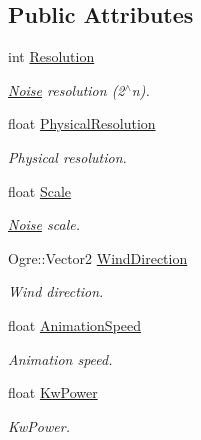 \subsection*{Public Attributes}
\begin{CompactItemize}
\item 
int \hyperlink{struct_hydrax_1_1_noise_1_1_f_f_t_1_1_options_5e7cb0d860838ae205212b13aad05a4b}{Resolution}
\begin{CompactList}\small\item\em \hyperlink{class_hydrax_1_1_noise_1_1_noise}{Noise} resolution (2$^\wedge$n). \item\end{CompactList}\item 
float \hyperlink{struct_hydrax_1_1_noise_1_1_f_f_t_1_1_options_f1273c65d2872198ae6b3c1dfb150ff4}{PhysicalResolution}
\begin{CompactList}\small\item\em Physical resolution. \item\end{CompactList}\item 
float \hyperlink{struct_hydrax_1_1_noise_1_1_f_f_t_1_1_options_98e3899bdfe6bf54910192543fbc374c}{Scale}
\begin{CompactList}\small\item\em \hyperlink{class_hydrax_1_1_noise_1_1_noise}{Noise} scale. \item\end{CompactList}\item 
Ogre::Vector2 \hyperlink{struct_hydrax_1_1_noise_1_1_f_f_t_1_1_options_9ee024e08048211c6674f00d61496037}{WindDirection}
\begin{CompactList}\small\item\em Wind direction. \item\end{CompactList}\item 
float \hyperlink{struct_hydrax_1_1_noise_1_1_f_f_t_1_1_options_87a99bc4e880913e1268cdb8b347998c}{AnimationSpeed}
\begin{CompactList}\small\item\em Animation speed. \item\end{CompactList}\item 
float \hyperlink{struct_hydrax_1_1_noise_1_1_f_f_t_1_1_options_2e3cb6246534f5abdfb23d8d0ce6fa22}{KwPower}
\begin{CompactList}\small\item\em KwPower. \item\end{CompactList}\item 

\end{CompactItemize}
